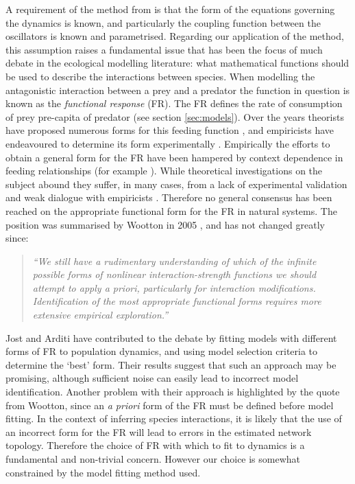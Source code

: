 A requirement of the method from \cite{shandilya2011inferring} is that the form of the equations governing the dynamics is known, and particularly the coupling function between the oscillators is known and parametrised. Regarding our application of the method, this assumption raises a fundamental issue that has been the focus of much debate in the ecological modelling literature: what mathematical functions should be used to describe the interactions between species. When modelling the antagonistic interaction between a prey and a predator the function in question is known as the \emph{functional response} (FR). The FR defines the rate of consumption of prey pre-capita of predator (see section \ref{sec:models}). Over the years theorists have proposed numerous forms for this feeding function \cite{holling1959some,arditi2012species,hwang2003global,jost2000identifying}, and empiricists have endeavoured to determine its form experimentally \cite{sarnelle2008type,schenk2002functional}. Empirically the efforts to obtain a general form for the FR have been hampered by context dependence in feeding relationships (for example \cite{englund2011temperature,zamani2006temperature}). While theoretical investigations on the subject abound they suffer, in many cases, from a lack of experimental validation and weak dialogue with empiricists \cite{berlow2004interaction,barraquand2014functional}. Therefore no general consensus has been reached on the appropriate functional form for the FR in natural systems. The position was summarised by Wootton in 2005 \citep{wootton2005measurement}, and has not changed greatly since:

\begin{quote}
\emph{``We still have a rudimentary understanding of which of the infinite possible forms of nonlinear interaction-strength functions we should attempt to apply a priori, particularly for  interaction modifications. Identification of the most appropriate functional forms requires more extensive empirical exploration.''}  
\end{quote}

Jost and Arditi have contributed to the debate \cite{jost2000identifying} by fitting models with different forms of FR to population dynamics, and using model selection criteria to determine the `best' form. Their results suggest that such an approach may be promising, although sufficient noise can easily lead to incorrect model identification. Another problem with their approach is highlighted by the quote from Wootton, since an \emph{a priori} form of the FR must be defined before model fitting. In the context of inferring species interactions, it is likely that the use of an incorrect form for the FR will lead to errors in the estimated network topology. Therefore the choice of FR with which to fit to dynamics is a fundamental and non-trivial concern. However our choice is somewhat constrained by the model fitting method used.

